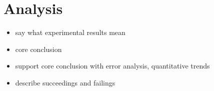 \section{Analysis}

\begin{itemize}
  \item say what experimental results mean
  \item core conclusion
  \item support core conclusion with error analysis, quantitative trends
  \item describe succeedings and failings
\end{itemize}